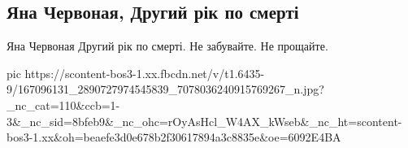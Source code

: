  
 
 
 
 

\subsection{Яна Червоная, Другий рік по смерті}

Яна Червоная
Другий рік по смерті.
Не забувайте. Не прощайте.


\ifcmt
  pic https://scontent-bos3-1.xx.fbcdn.net/v/t1.6435-9/167096131_2890727974545839_7078036240915769267_n.jpg?_nc_cat=110&ccb=1-3&_nc_sid=8bfeb9&_nc_ohc=rOyAsHcl_W4AX_kWseb&_nc_ht=scontent-bos3-1.xx&oh=beaefe3d0e678b2f30617894a3c8835e&oe=6092E4BA
\fi

